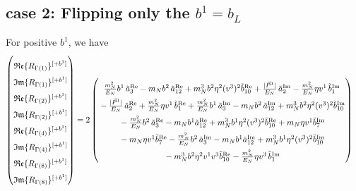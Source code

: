 \documentclass[]{article}
\numberwithin{equation}{section}
\newcommand{\bvec}{b}
\newcommand{\mN}{m_N}
\begin{document}
\subsection{case 2: Flipping only the $b^1=b_{L}$}
For positive $b^1$, we have 
\begin{align}
    \begin{pmatrix}
        \rule{0pt}{16pt} \mathfrak{Re}\{ R_{\Gamma(1)}\}^{[+b^1]} \\
        \rule{0pt}{16pt} \mathfrak{Im}\{ R_{\Gamma(1)}\}^{[+b^1]} \\
        \rule{0pt}{16pt} \mathfrak{Re}\{ R_{\Gamma(2)}\}^{[+b^1]} \\
        \rule{0pt}{16pt} \mathfrak{Im}\{ R_{\Gamma(2)}\}^{[+b^1]} \\
        \rule{0pt}{16pt} \mathfrak{Re}\{ R_{\Gamma(4)}\}^{[+b^1]} \\
        \rule{0pt}{16pt} \mathfrak{Im}\{ R_{\Gamma(4)}\}^{[+b^1]} \\
        \rule{0pt}{16pt} \mathfrak{Re}\{ R_{\Gamma(8)}\}^{[+b^1]} \\
        \rule{0pt}{16pt} \mathfrak{Im}\{ R_{\Gamma(8)}\}^{[+b^1]}
    \end{pmatrix} &= 2\begin{pmatrix}
     \rule{0pt}{16pt}   \frac{\mN^2}{E_N} \bvec^1\, \tilde a^{\text{Re}}_3-  \mN  \bvec^2 \, \tilde a^{\text{Re}}_{12}+  \mN^3  \bvec^2 \eta^2 (v^3)^2 \tilde b^{\text{Re}}_{10} +\frac{|\vec{P}^1|}{E_N}\, \tilde a^{\text{Im}}_2- \frac{\mN^2}{E_N} \eta v^1\, \tilde b^{\text{Im}}_1\\
      \rule{0pt}{16pt}  -\frac{|\vec{P}^1|}{E_N}\, \tilde a^{\text{Re}}_2+ \frac{\mN^2}{E_N} \eta v^1\, \tilde b^{\text{Re}}_1 + \frac{\mN^2}{E_N} \bvec^1\, \tilde a^{\text{Im}}_3-  \mN  \bvec^2 \, \tilde a^{\text{Im}}_{12}+  \mN^3  \bvec^2 \eta^2 (v^3)^2 \tilde b^{\text{Im}}_{10}\\
      \rule{0pt}{16pt}  -  \frac{\mN^2}{E_N} \bvec^2\, \tilde a^{\text{Re}}_3
		-  \mN   \bvec^1  \tilde a^{\text{Re}}_{12}+ \mN^3  \bvec^1 \eta^2 (v^3)^2 \tilde b^{\text{Re}}_{10}+\mN \eta v^1  \tilde b^{\text{Im}}_7 \\
      \rule{0pt}{16pt} - \mN \eta v^1  \tilde b^{\text{Re}}_7 -  \frac{\mN^2}{E_N} \bvec^2\, \tilde a^{\text{Im}}_3
		-  \mN   \bvec^1  \tilde a^{\text{Im}}_{12}+ \mN^3  \bvec^1 \eta^2 (v^3)^2 \tilde b^{\text{Im}}_{10}\\
      \rule{0pt}{16pt} -\mN^3 \bvec^2 \eta^2 v^1 v^3\tilde b^{\text{Re}}_{10}-\frac{\mN^2}{E_N} \eta v^3\, \tilde b^{\text{Im}}_1\\

\end{pmatrix}
\end{align}
\end{document}
